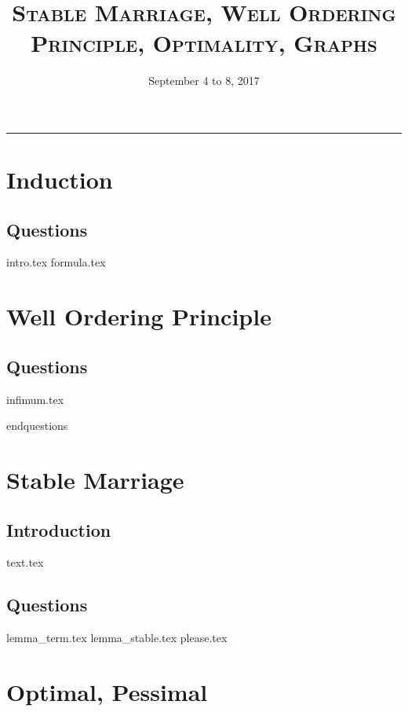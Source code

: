 \documentclass{exam}
\title{\textsc{Stable Marriage, Well Ordering Principle, Optimality, Graphs}}
\date{September 4 to 8, 2017}
\begin{document}
\maketitle
\rule{\textwidth}{0.15em}
\fontsize{12}{15}\selectfont
\thispagestyle{empty}


\section{Induction}
\subsection{Questions}
\begin{questions}
{intro.tex}
{formula.tex}

\section{Well Ordering Principle}
\subsection{Questions}
\begin{questions}
{infimum.tex}
\end{questions}
end{questions}

\section{Stable Marriage}
\subsection{Introduction}
{text.tex}
\subsection{Questions}
\begin{questions}
{lemma_term.tex}
{lemma_stable.tex}
{please.tex}
\end{questions}


\section{Optimal, Pessimal}

\end{questions}
\end{document}
